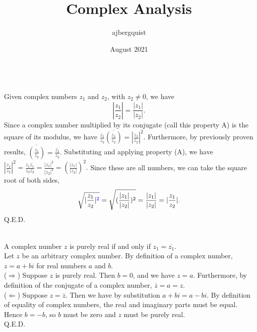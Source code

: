 \documentclass{article}
\title{Complex Analysis}
\author{ajbergquist }
\date{August 2021}
\theoremstyle{definition}
\newcommand{\cs}[1]{\color{blue}{#1}\normalcolor}
\begin{document}
\\ 

Given complex numbers $z_1$ and $z_2$, with $z_2 \ne 0$, we have
$$ |\frac{z_1}{z_2}| = \frac{|z_1|}{|z_2|}.$$
 Since a complex number multiplied by its conjugate (call this property A) is the square of its modulus, we have $\frac{z_1}{z_2}\overline{(\frac{z_1}{z_2})} = |\frac{z_1}{z_2}|^2.$ Furthermore, by previously proven results, $\overline{(\frac{z_1}{z_2})} = \frac{\overline{z_1}}{\overline{z_2}}.$ Substituting and applying property (A), we have $|\frac{z_1}{z_2}|^2 = \frac{z_1\overline{z_1}}{z_2\overline{z_2}} = \frac{|z_1|^2}{|z_2|^2} = (\frac{|z_1|}{|z_2|})^2.$ Since these are all \sout{\cs{complex}} \cs{nonnegative real} numbers, we can take the square root of both sides,
$$\sqrt{|\frac{z_1}{z_2}|\cs{^2}} = \sqrt{(\frac{|z_1|}{|z_2|})^2} = \frac{|z_1|}{|z_2|} = |\frac{z_1}{z_2}|.$$
Q.E.D.\\
\vspace{0.5cm}

\cs{5/5}

\\
 A complex number $z$ is purely real if and only if $z_1 = \overline{z_1}.$\\
 Let $z$ be an arbitrary complex number. By definition of a complex number, $z = a+bi$ for real numbers $a$ and $b$. \\
($\Rightarrow$) Suppose $z$ is purely real. Then $b = 0$, and we have $z = a$. Furthermore, by definition of the conjugate of a complex number, $\overline{z} = a = z.$\\
($\Leftarrow$) Suppose $z = \overline{z}$. Then we have by substitution $a+bi = a-bi.$ By definition of equality of complex numbers, the real and imaginary parts must be equal. Hence $b = -b$, so $b$ must be zero and $z$ must be purely real.\\
Q.E.D.
\\

\cs{5/5}

\vspace{0.5cm}
\end{document}
